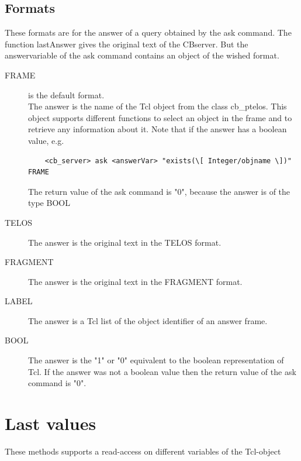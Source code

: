  \subsection{Formats} 
  \label{tcl_answerformats}
	These formats are for the answer of a query 
	 obtained by the ask command.
	The function lastAnswer gives the original text of the CBserver.
	But the answervariable of the ask command contains an object of the 
	wished format.
  \begin{description}	
   \item[FRAME] is the default format. \\
	The answer is the name of the Tcl object from the class cb\_ptelos.
	This object supports different functions to select an object 
	 in the frame and to retrieve any information about it.
    	Note that if the answer has a boolean value, e.g. 
    \begin{verbatim}
	<cb_server> ask <answerVar> "exists(\[ Integer/objname \])" FRAME
    \end{verbatim}
	The return value of the ask command is "0", because the answer is
	of the type BOOL
   \item[TELOS]
  	The answer is the original text in the TELOS format.
   \item[FRAGMENT]
  	The answer is the original text in the FRAGMENT format.
   \item[LABEL]
	The answer is a Tcl list of the object identifier of an answer frame.
   \item[BOOL]
	The answer is the "1" or "0" equivalent to the boolean 
	 representation of Tcl.
	If the answer was not a boolean value then the return value of
	 the ask command is "0".
  \end{description}
 \section{Last values}
	These methods supports a read-access on different variables 
	of the  Tcl-object
